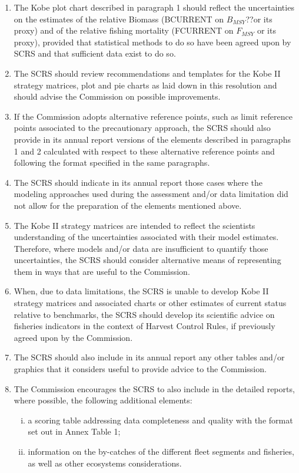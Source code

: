 \begin{enumerate}
    \item  The Kobe plot chart described in paragraph 1 should reflect the uncertainties on the estimates of the relative Biomass (BCURRENT on $B_{MSY}$??or its proxy) and of the relative fishing mortality (FCURRENT on $F_{MSY}$ or its proxy), provided that statistical methods to do so have been agreed upon by SCRS and that sufficient data exist to do so.
    \item  The SCRS should review recommendations and templates for the Kobe II strategy matrices, plot and pie charts as laid down in this resolution and should advise the Commission on possible improvements.
    \item  If the Commission adopts alternative reference points, such as limit reference points associated to the precautionary approach, the SCRS should also provide in its annual report versions of the elements described in paragraphs 1 and 2 calculated with respect to these alternative reference points and following the format specified in the same paragraphs.
    \item   The SCRS should indicate in its annual report those cases where the modeling approaches used during the assessment and/or data limitation did not allow for the preparation of the elements mentioned above. 
    \item   The Kobe II strategy matrices are intended to reflect the scientists understanding of the uncertainties associated with their model estimates. Therefore, where models and/or data are insufficient to quantify those uncertainties, the SCRS should consider alternative means of representing them in ways that are useful to the Commission.
    \item   When, due to data limitations, the SCRS is unable to develop Kobe II strategy matrices and associated charts or other estimates of current status relative to benchmarks, the SCRS should develop its scientific advice on fisheries indicators in the context of Harvest Control Rules, if previously agreed upon by the Commission.
    \item   The SCRS should also include in its annual report any other tables and/or graphics that it considers useful to provide advice to the Commission.
    \item   The Commission encourages the SCRS to also include in the detailed reports, where possible, the following additional elements:

    \begin{enumerate}[i)]
      \item a scoring table addressing data completeness and quality with the format set out in Annex Table 1;
      \item information on the by-catches of the different fleet segments and fisheries, as well as other ecosystems considerations.
      \end{enumerate}
  \end{enumerate}

